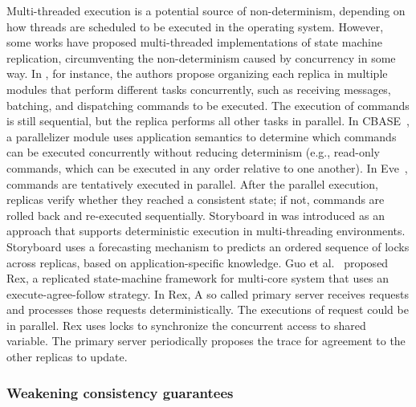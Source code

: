 Multi-threaded execution is a potential source of non-determinism, depending on
how threads are scheduled to be executed in the operating system. However, some
works have proposed multi-threaded implementations of state machine replication,
circumventing the non-determinism caused by concurrency in some way. In
\cite{santos2013htsmr}, for instance, the authors propose organizing each
replica in multiple modules that perform different tasks concurrently, such as
receiving messages, batching, and dispatching commands to be executed. The
execution of commands is still sequential, but the replica performs all other
tasks in parallel. In CBASE~\cite{Kotla:2004ep}, a parallelizer module uses
application semantics to determine which commands can be executed concurrently
without reducing determinism (e.g., read-only commands, which can be executed in
any order relative to one another). In Eve~\cite{Kapritsos:2012um}, commands are
tentatively executed in parallel. After the parallel execution, replicas verify
whether they reached a consistent state; if not, commands are rolled back and
re-executed sequentially. Storyboard in \cite{Kapitza:2010Storyboard} was
introduced as an approach that supports deterministic execution in
multi-threading environments. Storyboard uses a forecasting mechanism to
predicts an ordered sequence of locks across replicas, based on
application-specific knowledge. Guo et al.~\cite{guo2014rex} proposed Rex, a
replicated state-machine framework for multi-core system that uses an
execute-agree-follow strategy. In Rex, A so called primary server receives
requests and processes those requests deterministically. The executions of
request could be in parallel. Rex uses locks to synchronize the concurrent
access to shared variable. The primary server periodically proposes the trace
for agreement to the other replicas to update.

\subsubsection{Weakening consistency guarantees}

